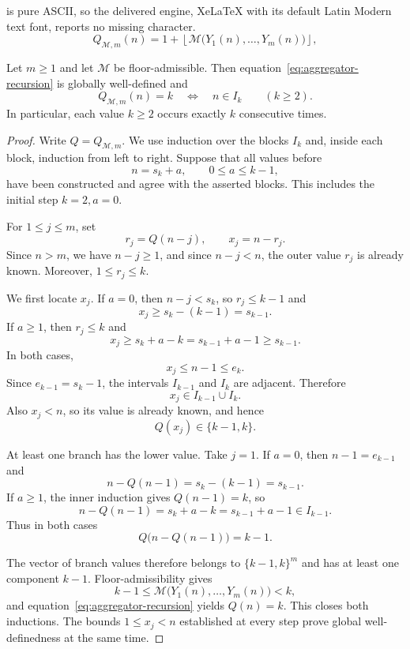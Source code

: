 \documentclass[10pt,a4paper]{amsart}
\newcommand{\floor}[1]{\left\lfloor #1\right\rfloor}
\begin{document}
is pure ASCII, so the delivered engine, XeLaTeX with its default Latin Modern text font, reports no missing character.
\begin{equation}\label{eq:aggregator-recursion}
Q_{\mathcal{M},m}(n)
=
1+\floor{
\mathcal{M}\bigl(Y_1(n),\ldots,Y_m(n)\bigr)
},
\end{equation}

\begin{theorem}\label{thm:aggregator}
Let $m\ge1$ and let $\mathcal{M}$ be floor-admissible.  Then
equation~\eqref{eq:aggregator-recursion} is globally well-defined and
\begin{equation}\label{eq:exact-blocks}
Q_{\mathcal{M},m}(n)=k
\quad\Longleftrightarrow\quad
n\in I_k
\qquad (k\ge2).
\end{equation}
In particular, each value $k\ge2$ occurs exactly $k$ consecutive times.
\end{theorem}

\begin{proof}
Write $Q=Q_{\mathcal{M},m}$.  We use induction over the blocks $I_k$ and,
inside each block, induction from left to right.  Suppose that all values
before
\[
n=s_k+a,
\qquad 0\le a\le k-1,
\]
have been constructed and agree with the asserted blocks.  This includes
the initial step $k=2,a=0$.

For $1\le j\le m$, set
\[
r_j=Q(n-j),
\qquad
x_j=n-r_j.
\]
Since $n>m$, we have $n-j\ge1$, and since $n-j<n$, the outer value $r_j$
is already known.  Moreover, $1\le r_j\le k$.

We first locate $x_j$.  If $a=0$, then $n-j<s_k$, so $r_j\le k-1$ and
\[
x_j\ge s_k-(k-1)=s_{k-1}.
\]
If $a\ge1$, then $r_j\le k$ and
\[
x_j\ge s_k+a-k=s_{k-1}+a-1\ge s_{k-1}.
\]
In both cases,
\[
x_j\le n-1\le e_k.
\]
Since $e_{k-1}=s_k-1$, the intervals $I_{k-1}$ and $I_k$ are adjacent.
Therefore
\[
x_j\in I_{k-1}\cup I_k.
\]
Also $x_j<n$, so its value is already known, and hence
\begin{equation}\label{eq:two-level-branches}
Q(x_j)\in\{k-1,k\}.
\end{equation}

At least one branch has the lower value.  Take $j=1$.  If $a=0$, then
$n-1=e_{k-1}$ and
\[
n-Q(n-1)=s_k-(k-1)=s_{k-1}.
\]
If $a\ge1$, the inner induction gives $Q(n-1)=k$, so
\[
n-Q(n-1)=s_k+a-k=s_{k-1}+a-1\in I_{k-1}.
\]
Thus in both cases
\begin{equation}\label{eq:lower-branch}
Q\bigl(n-Q(n-1)\bigr)=k-1.
\end{equation}

The vector of branch values therefore belongs to $\{k-1,k\}^m$ and has at
least one component $k-1$.  Floor-admissibility gives
\[
k-1
\le
\mathcal{M}\bigl(Y_1(n),\ldots,Y_m(n)\bigr)
<k,
\]
and equation~\eqref{eq:aggregator-recursion} yields $Q(n)=k$.  This closes
both inductions.  The bounds $1\le x_j<n$ established at every step prove
global well-definedness at the same time.
\end{proof}
\end{document}
